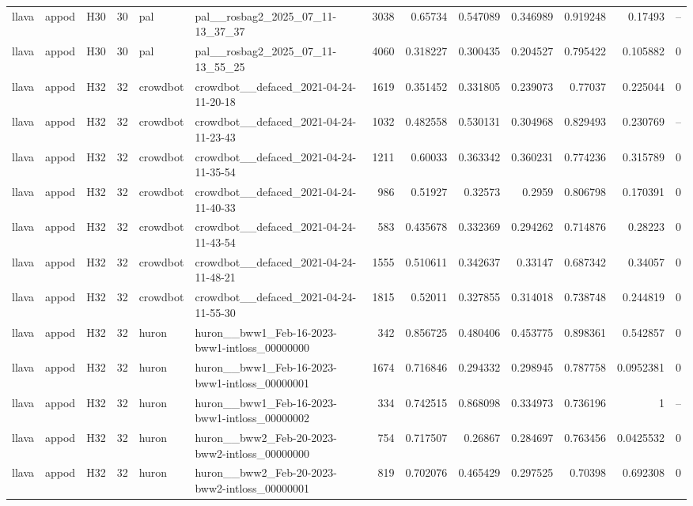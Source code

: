 \begin{longtable}{lllrllrrrrrrr}
llava & appod & H30 & 30 & pal & pal\_\_rosbag2\_2025\_07\_11-13\_37\_37 & 3038 & 0.65734 & 0.547089 & 0.346989 & 0.919248 & 0.17493 & -- \\
llava & appod & H30 & 30 & pal & pal\_\_rosbag2\_2025\_07\_11-13\_55\_25 & 4060 & 0.318227 & 0.300435 & 0.204527 & 0.795422 & 0.105882 & 0 \\
llava & appod & H32 & 32 & crowdbot & crowdbot\_\_defaced\_2021-04-24-11-20-18 & 1619 & 0.351452 & 0.331805 & 0.239073 & 0.77037 & 0.225044 & 0 \\
llava & appod & H32 & 32 & crowdbot & crowdbot\_\_defaced\_2021-04-24-11-23-43 & 1032 & 0.482558 & 0.530131 & 0.304968 & 0.829493 & 0.230769 & -- \\
llava & appod & H32 & 32 & crowdbot & crowdbot\_\_defaced\_2021-04-24-11-35-54 & 1211 & 0.60033 & 0.363342 & 0.360231 & 0.774236 & 0.315789 & 0 \\
llava & appod & H32 & 32 & crowdbot & crowdbot\_\_defaced\_2021-04-24-11-40-33 & 986 & 0.51927 & 0.32573 & 0.2959 & 0.806798 & 0.170391 & 0 \\
llava & appod & H32 & 32 & crowdbot & crowdbot\_\_defaced\_2021-04-24-11-43-54 & 583 & 0.435678 & 0.332369 & 0.294262 & 0.714876 & 0.28223 & 0 \\
llava & appod & H32 & 32 & crowdbot & crowdbot\_\_defaced\_2021-04-24-11-48-21 & 1555 & 0.510611 & 0.342637 & 0.33147 & 0.687342 & 0.34057 & 0 \\
llava & appod & H32 & 32 & crowdbot & crowdbot\_\_defaced\_2021-04-24-11-55-30 & 1815 & 0.52011 & 0.327855 & 0.314018 & 0.738748 & 0.244819 & 0 \\
llava & appod & H32 & 32 & huron & huron\_\_bww1\_Feb-16-2023-bww1-intloss\_00000000 & 342 & 0.856725 & 0.480406 & 0.453775 & 0.898361 & 0.542857 & 0 \\
llava & appod & H32 & 32 & huron & huron\_\_bww1\_Feb-16-2023-bww1-intloss\_00000001 & 1674 & 0.716846 & 0.294332 & 0.298945 & 0.787758 & 0.0952381 & 0 \\
llava & appod & H32 & 32 & huron & huron\_\_bww1\_Feb-16-2023-bww1-intloss\_00000002 & 334 & 0.742515 & 0.868098 & 0.334973 & 0.736196 & 1 & -- \\
llava & appod & H32 & 32 & huron & huron\_\_bww2\_Feb-20-2023-bww2-intloss\_00000000 & 754 & 0.717507 & 0.26867 & 0.284697 & 0.763456 & 0.0425532 & 0 \\
llava & appod & H32 & 32 & huron & huron\_\_bww2\_Feb-20-2023-bww2-intloss\_00000001 & 819 & 0.702076 & 0.465429 & 0.297525 & 0.70398 & 0.692308 & 0 \\

\end{longtable}
